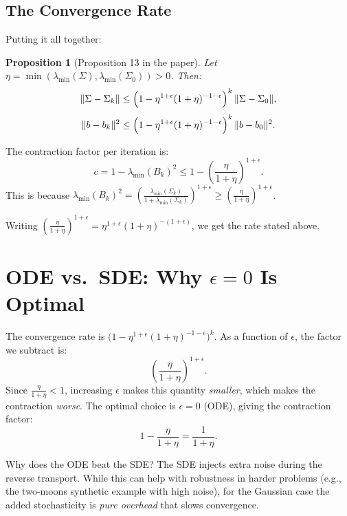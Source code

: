 \documentclass[11pt, a4paper]{article}
\newtheorem{proposition}{Proposition}
\theoremstyle{definition}
\begin{document}
\subsection{The Convergence Rate}

Putting it all together:

\begin{proposition}[Proposition 13 in the paper]
Let $\eta = \min(\lambda_{\min}(\Sigma), \lambda_{\min}(\Sigma_0)) > 0$. Then:
\[
    \|\Sigma - \Sigma_k\| \leq \Bigl(1 - \eta^{1+\epsilon}(1+\eta)^{-1-\epsilon}\Bigr)^k\,\|\Sigma - \Sigma_0\|,
\]
\[
    \|b - b_k\|^2 \leq \Bigl(1 - \eta^{1+\epsilon}(1+\eta)^{-1-\epsilon}\Bigr)^k\,\|b - b_0\|^2.
\]
\end{proposition}

\begin{calculation}[title={Deriving the rate}]
The contraction factor per iteration is:
\[
    c = 1 - \lambda_{\min}(B_k)^2 \leq 1 - \left(\frac{\eta}{1+\eta}\right)^{1+\epsilon}.
\]
This is because $\lambda_{\min}(B_k)^2 = \left(\frac{\lambda_{\min}(\Sigma_k)}{1+\lambda_{\min}(\Sigma_k)}\right)^{1+\epsilon} \geq \left(\frac{\eta}{1+\eta}\right)^{1+\epsilon}$.

\medskip
Writing $\left(\frac{\eta}{1+\eta}\right)^{1+\epsilon} = \eta^{1+\epsilon}(1+\eta)^{-(1+\epsilon)}$, we get the rate stated above.
\end{calculation}

\section{ODE vs.\ SDE: Why $\epsilon = 0$ Is Optimal}

\begin{keyidea}
The convergence rate is $\bigl(1 - \eta^{1+\epsilon}(1+\eta)^{-1-\epsilon}\bigr)^k$. As a function of $\epsilon$, the factor we subtract is:
\[
    \left(\frac{\eta}{1+\eta}\right)^{1+\epsilon}.
\]
Since $\frac{\eta}{1+\eta} < 1$, increasing $\epsilon$ makes this quantity \emph{smaller}, which makes the contraction \emph{worse}. The optimal choice is $\epsilon = 0$ (ODE), giving the contraction factor:
\[
    1 - \frac{\eta}{1+\eta} = \frac{1}{1+\eta}.
\]
\end{keyidea}

\begin{intuition}
Why does the ODE beat the SDE? The SDE injects extra noise during the reverse transport. While this can help with robustness in harder problems (e.g., the two-moons synthetic example with high noise), for the Gaussian case the added stochasticity is \emph{pure overhead} that slows convergence.
\end{intuition}
\end{document}

